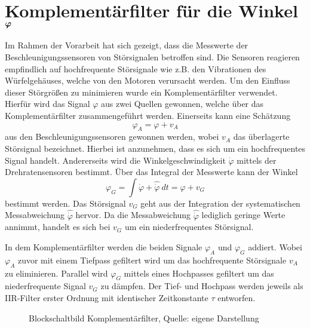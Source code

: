 \section{Komplementärfilter für die Winkel $\boldsymbol{\varphi}$}
Im Rahmen der Vorarbeit hat sich gezeigt, dass die Messwerte der Beschleunigungssensoren von Störsignalen betroffen sind. Die Sensoren reagieren empfindlich auf hochfrequente Störsignale wie z.B. den Vibrationen des Würfelgehäuses, welche von den Motoren verursacht werden. Um den Einfluss dieser Störgrößen zu minimieren wurde ein Komplementärfilter verwendet. Hierfür wird das Signal $\varphi$ aus zwei Quellen gewonnen, welche über das Komplementärfilter zusammengeführt werden. Einerseits kann eine Schätzung
\begin{equation}
\varphi_A = \varphi + v_A
\end{equation}
aus den Beschleunigungssensoren gewonnen werden, wobei $v_A$ das überlagerte Störsignal bezeichnet. Hierbei ist anzunehmen, dass es sich um ein hochfrequentes Signal handelt. Andererseits wird die Winkelgeschwindigkeit $\dot{\varphi}$ mittels der Drehratensensoren bestimmt. Über das Integral der Messwerte kann der Winkel
\begin{equation}
\varphi_G = \int \dot{\varphi} + \hat{\dot{\varphi}}\ dt = \varphi + v_G 
\end{equation}
bestimmt werden. Das Störsignal $v_G$ geht aus der Integration der systematischen Messabweichung $\hat{\dot{\varphi}}$ hervor. Da die Messabweichung $\hat{\dot{\varphi}}$ lediglich geringe Werte annimmt, handelt es sich bei $v_G$ um ein niederfrequentes Störsignal.

In dem Komplementärfilter werden die beiden Signale $\varphi_A$ und $\varphi_G$ addiert. Wobei $\varphi_A$ zuvor mit einem Tiefpass gefiltert wird um das hochfrequente Störsignale $v_A$ zu eliminieren. Parallel wird $\varphi_G$ mittels eines Hochpasses gefiltert um das niederfrequente Signal $v_G$ zu dämpfen. Der Tief- und Hochpass werden jeweils als IIR-Filter erster Ordnung mit identischer Zeitkonstante $\tau$ entworfen.
\begin{figure}[h!]

\label{bsb_kompfilter}
\caption{Blockschaltbild Komplementärfilter, Quelle: eigene Darstellung}
\end{figure}

